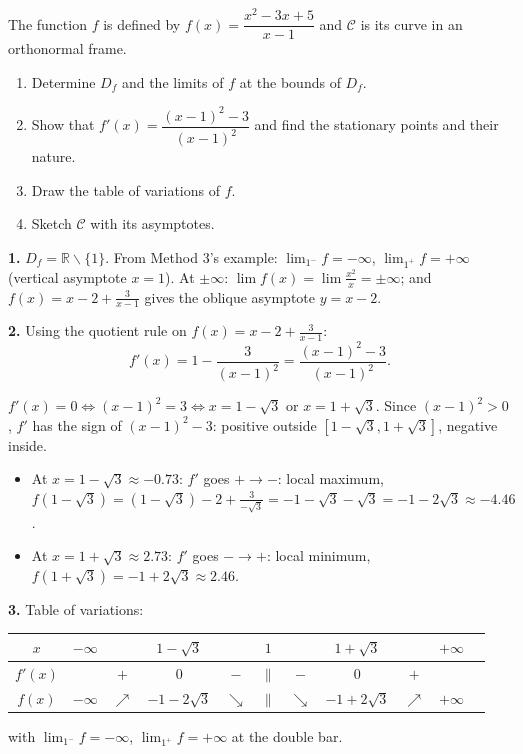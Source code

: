 \documentclass[11pt]{article}
\def\setminus{\mathbin{\backslash}}\let\smallsetminus\setminus
\begin{document}
\begin{exoresolu}
The function $f$ is defined by $f(x)=\dfrac{x^2-3x+5}{x-1}$ and $\mathcal{C}$ is its curve in an orthonormal frame.
\begin{enumerate}
\item Determine $D_f$ and the limits of $f$ at the bounds of $D_f$.
\item Show that $f'(x)=\dfrac{(x-1)^2-3}{(x-1)^2}$ and find the stationary points and their nature.
\item Draw the table of variations of $f$.
\item Sketch $\mathcal{C}$ with its asymptotes.
\end{enumerate}
\tcblower
\textbf{1.} $D_f=\mathbb{R}\setminus\{1\}$. From Method 3's example: $\lim_{1^-}f=-\infty$, $\lim_{1^+}f=+\infty$ (vertical asymptote $x=1$). At $\pm\infty$: $\lim f(x)=\lim \frac{x^2}{x}=\pm\infty$; and $f(x)=x-2+\frac{3}{x-1}$ gives the oblique asymptote $y=x-2$.

\textbf{2.} Using the quotient rule on $f(x)=x-2+\frac{3}{x-1}$:
\[ f'(x)=1-\frac{3}{(x-1)^2}=\frac{(x-1)^2-3}{(x-1)^2}. \]

$f'(x)=0\iff (x-1)^2=3\iff x=1-\sqrt{3}$ or $x=1+\sqrt{3}$. Since $(x-1)^2>0$, $f'$ has the sign of $(x-1)^2-3$: positive outside $[1-\sqrt3,1+\sqrt3]$, negative inside.
\begin{itemize}
\item At $x=1-\sqrt3\approx-0.73$: $f'$ goes $+\to-$: local maximum, $f(1-\sqrt3)=(1-\sqrt3)-2+\frac{3}{-\sqrt3}=-1-\sqrt3-\sqrt3=-1-2\sqrt3\approx-4.46$.
\item At $x=1+\sqrt3\approx2.73$: $f'$ goes $-\to+$: local minimum, $f(1+\sqrt3)=-1+2\sqrt3\approx2.46$.
\end{itemize}

\textbf{3.} Table of variations:
\begin{center}
\begin{tabular}{|c|cccccccccc|}
\hline
$x$ & $-\infty$ & & $1-\sqrt3$ & & $1$ & & $1+\sqrt3$ & & $+\infty$ \\
\hline
$f'(x)$ & & $+$ & $0$ & $-$ & $\|$ & $-$ & $0$ & $+$ & \\
\hline
$f(x)$ & $-\infty$ & $\nearrow$ & $-1-2\sqrt3$ & $\searrow$ & $\|$ & $\searrow$ & $-1+2\sqrt3$ & $\nearrow$ & $+\infty$ \\
\hline
\end{tabular}
\end{center}
with $\lim_{1^-}f=-\infty$, $\lim_{1^+}f=+\infty$ at the double bar.


\end{exoresolu}
\end{document}
